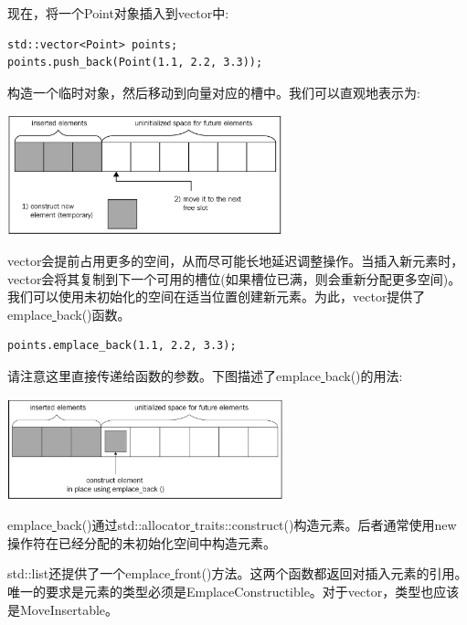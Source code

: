 现在，将一个Point对象插入到vector中: \par

\begin{lstlisting}[caption={}]
std::vector<Point> points;
points.push_back(Point(1.1, 2.2, 3.3));
\end{lstlisting}

构造一个临时对象，然后移动到向量对应的槽中。我们可以直观地表示为: \par

\begin{center}
	\includegraphics[width=0.6\textwidth]{content/Section-2/Chapter-6/15}
\end{center}

vector会提前占用更多的空间，从而尽可能长地延迟调整操作。当插入新元素时，vector会将其复制到下一个可用的槽位(如果槽位已满，则会重新分配更多空间)。我们可以使用未初始化的空间在适当位置创建新元素。为此，vector提供了emplace\underline{ }back()函数。 \par

\begin{lstlisting}[caption={}]
points.emplace_back(1.1, 2.2, 3.3);
\end{lstlisting}

请注意这里直接传递给函数的参数。下图描述了emplace\underline{ }back()的用法: \par

\begin{center}
	\includegraphics[width=0.6\textwidth]{content/Section-2/Chapter-6/16}
\end{center}

emplace\underline{ }back()通过std::allocator\underline{ }traits::construct()构造元素。后者通常使用new操作符在已经分配的未初始化空间中构造元素。 \par
std::list还提供了一个emplace\underline{ }front()方法。这两个函数都返回对插入元素的引用。唯一的要求是元素的类型必须是EmplaceConstructible。对于vector，类型也应该是MoveInsertable。 \par


